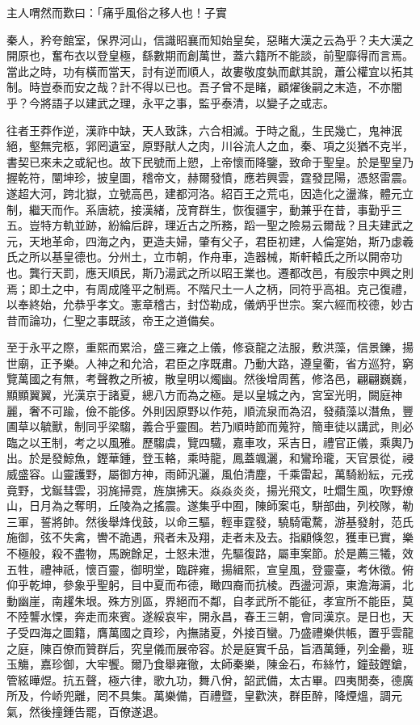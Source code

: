 
\begin{pinyinscope}
主人喟然而歎曰：「痛乎風俗之移人也！子實

秦人，矜夸館室，保界河山，信識昭襄而知始皇矣，惡睹大漢之云為乎？夫大漢之開原也，奮布衣以登皇極，繇數期而創萬世，蓋六籍所不能談，前聖靡得而言焉。當此之時，功有橫而當天，討有逆而順人，故婁敬度埶而獻其說，蕭公權宜以拓其制。時豈泰而安之哉？計不得以已也。吾子曾不是睹，顧燿後嗣之末造，不亦闇乎？今將語子以建武之理，永平之事，監乎泰清，以變子之或志。

往者王莽作逆，漢祚中缺，天人致誅，六合相滅。于時之亂，生民幾亡，鬼神泯絕，壑無完柩，郛罔遺室，原野猒人之肉，川谷流人之血，秦、項之災猶不克半，書契已來未之或紀也。故下民號而上愬，上帝懷而降鑒，致命于聖皇。於是聖皇乃握乾符，闡坤珍，披皇圖，稽帝文，赫爾發憤，應若興雲，霆發昆陽，憑怒雷震。遂超大河，跨北嶽，立號高邑，建都河洛。紹百王之荒屯，因造化之盪滌，體元立制，繼天而作。系唐統，接漢緒，茂育群生，恢復疆宇，動兼乎在昔，事勤乎三五。豈特方軌並跡，紛綸后辟，理近古之所務，蹈一聖之險易云爾哉？且夫建武之元，天地革命，四海之內，更造夫婦，肇有父子，君臣初建，人倫寔始，斯乃虙羲氏之所以基皇德也。分州土，立市朝，作舟車，造器械，斯軒轅氏之所以開帝功也。龔行天罰，應天順民，斯乃湯武之所以昭王業也。遷都改邑，有殷宗中興之則焉；即土之中，有周成隆平之制焉。不階尺土一人之柄，同符乎高祖。克己復禮，以奉終始，允恭乎孝文。憲章稽古，封岱勒成，儀炳乎世宗。案六經而校德，妙古昔而論功，仁聖之事既該，帝王之道備矣。

至于永平之際，重熙而累洽，盛三雍之上儀，修袞龍之法服，敷洪藻，信景鑠，揚世廟，正予樂。人神之和允洽，君臣之序既肅。乃動大路，遵皇衢，省方巡狩，窮覽萬國之有無，考聲教之所被，散皇明以燭幽。然後增周舊，修洛邑，翩翩巍巍，顯顯翼翼，光漢京于諸夏，總八方而為之極。是以皇城之內，宮室光明，闕庭神麗，奢不可踰，儉不能侈。外則因原野以作苑，順流泉而為沼，發蘋藻以潛魚，豐圃草以毓獸，制同乎梁騶，義合乎靈囿。若乃順時節而蒐狩，簡車徒以講武，則必臨之以王制，考之以風雅。歷騶虞，覽四驖，嘉車攻，采吉日，禮官正儀，乘輿乃出。於是發鯨魚，鏗華鍾，登玉輅，乘時龍，鳳蓋颯灑，和鸞玲瓏，天官景從，祲威盛容。山靈護野，屬御方神，雨師汎灑，風伯清塵，千乘雷起，萬騎紛紜，元戎竟野，戈鋋彗雲，羽旄掃霓，旌旗拂天。焱焱炎炎，揚光飛文，吐爓生風，吹野燎山，日月為之奪明，丘陵為之搖震。遂集乎中囿，陳師案屯，駢部曲，列校隊，勒三軍，誓將帥。然後舉烽伐鼓，以命三驅，輕車霆發，驍騎電騖，游基發射，范氏施御，弦不失禽，轡不詭遇，飛者未及翔，走者未及去。指顧倏忽，獲車已實，樂不極般，殺不盡物，馬踠餘足，士怒未泄，先驅復路，屬車案節。於是薦三犧，效五牲，禮神祇，懷百靈，御明堂，臨辟雍，揚緝熙，宣皇風，登靈臺，考休徵。俯仰乎乾坤，參象乎聖躬，目中夏而布德，瞰四裔而抗棱。西盪河源，東澹海漘，北動幽崖，南趯朱垠。殊方別區，界絕而不鄰，自孝武所不能征，孝宣所不能臣，莫不陸讋水慄，奔走而來賓。遂綏哀牢，開永昌，春王三朝，會同漢京。是日也，天子受四海之圖籍，膺萬國之貢珍，內撫諸夏，外接百蠻。乃盛禮樂供帳，置乎雲龍之庭，陳百僚而贊群后，究皇儀而展帝容。於是庭實千品，旨酒萬鍾，列金罍，班玉觴，嘉珍御，大牢饗。爾乃食舉雍徹，太師秦樂，陳金石，布絲竹，鐘鼓鏗鎗，管絃曄煜。抗五聲，極六律，歌九功，舞八佾，韶武備，太古畢。四夷閒奏，德廣所及，仱峤兜離，罔不具集。萬樂備，百禮暨，皇歡浹，群臣醉，降煙熅，調元氣，然後撞鍾告罷，百僚遂退。


\end{pinyinscope}
